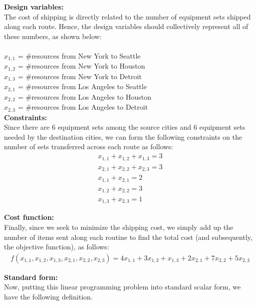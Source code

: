 \documentclass[11pt]{article}
\begin{document}
\begin{prob}{2}
\end{prob}
\begin{sol} 

\textbf{Design variables:}\\ 
The cost of shipping is directly related to the number of equipment sets shipped along each route. Hence, the design variables should collectively represent all of these numbers, as shown below: \\ \\
$x_{1,1}$ = \#resources from New York to Seattle\\
$x_{1,2}$ = \#resources from New York to Houston\\
$x_{1,3}$ = \#resources from New York to Detroit \\
$x_{2,1}$ = \#resources from Los Angeles to Seattle \\
$x_{2,2}$ = \#resources from Los Angeles to Houston \\
$x_{2,3}$ = \#resources from Los Angeles to Detroit \\

\textbf{Constraints:} \\
Since there are $6$ equipment sets among the source cities and $6$ equipment sets needed by the destination cities, we can form the following constraints on the number of sets transferred across each route as follows:
\begin{eqnarray*}
x_{1,1} + x_{1,2} + x_{1,3} = 3 \\
x_{2,1} + x_{2,2} + x_{2,3} = 3 \\
x_{1,1} + x_{2,1} = 2 \\
x_{1,2} + x_{2,2} = 3 \\
x_{1,3} + x_{2,3} = 1 
\end{eqnarray*}

\textbf{Cost function:} \\
Finally, since we seek to minimize the shipping cost, we simply add up the number of items sent along each routine to find the total cost (and subsequently, the objective function), as follows:
\begin{eqnarray*}
f(x_{1,1},x_{1,2},x_{1,3},x_{2,1},x_{2,2},x_{2,3}) = 4x_{1,1} + 3x_{1,2} + x_{1,3} + 2x_{2,1} + 7x_{2,2} + 5x_{2,3}
\end{eqnarray*}

\textbf{Standard form:} \\
Now, putting this linear programming problem into standard scalar form, we have the following definition. \\


\end{sol}
\end{document}
